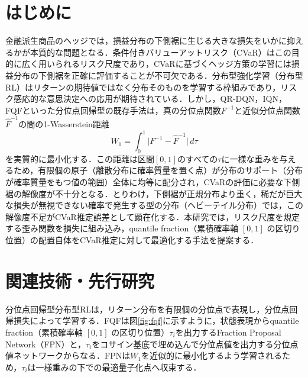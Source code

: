 \documentclass[a4paper,twocolumn,10pt]{jsarticle}
\begin{document}

\section{はじめに}
金融派生商品のヘッジでは，損益分布の下側裾に生じる大きな損失をいかに抑えるかが本質的な問題となる．条件付きバリューアットリスク（CVaR）はこの目的に広く用いられるリスク尺度であり，CVaRに基づくヘッジ方策の学習には損益分布の下側裾を正確に評価することが不可欠である．分布型強化学習（分布型RL）はリターンの期待値ではなく分布そのものを学習する枠組みであり，リスク感応的な意思決定への応用が期待されている．しかし，QR-DQN，IQN\cite{iqn}，FQF\cite{fqf}といった分位点回帰型の既存手法は，真の分位点関数$F^{-1}$と近似分位点関数$\hat F^{-1}$の間の1-Wasserstein距離
\begin{equation}
W_1=\int_0^1 \bigl|F^{-1}-\hat F^{-1}\bigr|\,d\tau
\end{equation}
を実質的に最小化する．この距離は区間$[0,1]$のすべての$\tau$に一様な重みを与えるため，有限個の原子（離散分布に確率質量を置く点）が分布のサポート（分布が確率質量をもつ値の範囲）全体に均等に配分され，CVaRの評価に必要な下側裾の解像度が不十分となる．とりわけ，下側裾が正規分布より重く，稀だが巨大な損失が無視できない確率で発生する型の分布（ヘビーテイル分布）では，この解像度不足がCVaR推定誤差として顕在化する．本研究では，リスク尺度を規定する歪み関数を損失に組み込み，quantile fraction（累積確率軸 $[0, 1]$ の区切り位置）の配置自体をCVaR推定に対して最適化する手法を提案する．

\section{関連技術・先行研究}
分位点回帰型分布型RLは，リターン分布を有限個の分位点で表現し，分位点回帰損失によって学習する．FQF\cite{fqf}は図\ref{fig:fqf}に示すように，状態表現からquantile fraction（累積確率軸 $[0, 1]$ の区切り位置）$\tau_i$を出力するFraction Proposal Network（FPN）と，$\tau_i$をコサイン基底で埋め込んで分位点値を出力する分位点値ネットワークからなる．FPNは$W_1$を近似的に最小化するよう学習されるため，$\tau_i$は一様重みの下での最適量子化点へ収束する．
\end{document}
